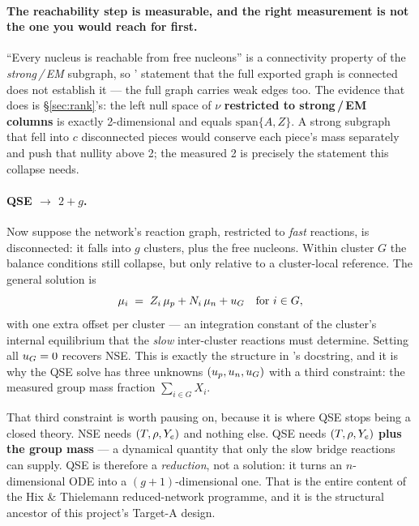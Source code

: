 \paragraph{The reachability step is measurable, and the right measurement is not
the one you would reach for first.} ``Every nucleus is reachable from free
nucleons'' is a connectivity property of the \emph{strong\,/\,EM} subgraph, so
' statement that the full exported graph is connected
 does not establish it --- the full graph carries weak
edges too. The evidence that does is \S\ref{sec:rank}'s: the left null space of
$\nu$ \textbf{restricted to strong\,/\,EM columns} is exactly 2-dimensional and
equals $\mathrm{span}\{A, Z\}$. A strong subgraph that fell into $c$
disconnected pieces would conserve each piece's mass separately and push that
nullity above 2; the measured 2 is precisely the statement this collapse needs.

\paragraph{QSE $\to$ $2 + g$.} Now suppose the network's reaction graph,
restricted to \emph{fast} reactions, is disconnected: it falls into $g$
clusters, plus the free nucleons. Within cluster $G$ the balance conditions
still collapse, but only relative to a cluster-local reference. The general
solution is
%
\begin{equation}
\mu_i \;=\; Z_i\,\mu_p + N_i\,\mu_n + u_{G} \quad\text{for } i \in G,
\label{eq:qsemu}
\end{equation}
%
with one extra offset \uG{} per cluster --- an integration constant of the
cluster's internal equilibrium that the \emph{slow} inter-cluster reactions must
determine. Setting all $u_{G} = 0$ recovers NSE. This is exactly the structure in
's docstring, and it is why the QSE solve has three unknowns
$(u_{p}, u_{n}, u_{G})$ with a third constraint: the measured group mass fraction
$\sum_{i \in G} X_i$.

That third constraint is worth pausing on, because it is where QSE stops being a
closed theory. NSE needs $(T, \rho, Y_{e})$ and nothing else. QSE needs
$(T, \rho, Y_{e})$ \textbf{plus the group mass} --- a dynamical quantity that only
the slow bridge reactions can supply. QSE is therefore a \emph{reduction}, not a
solution: it turns an $n$-dimensional ODE into a $(g{+}1)$-dimensional one. That
is the entire content of the Hix \& Thielemann reduced-network programme, and it
is the structural ancestor of this project's Target-A design.

